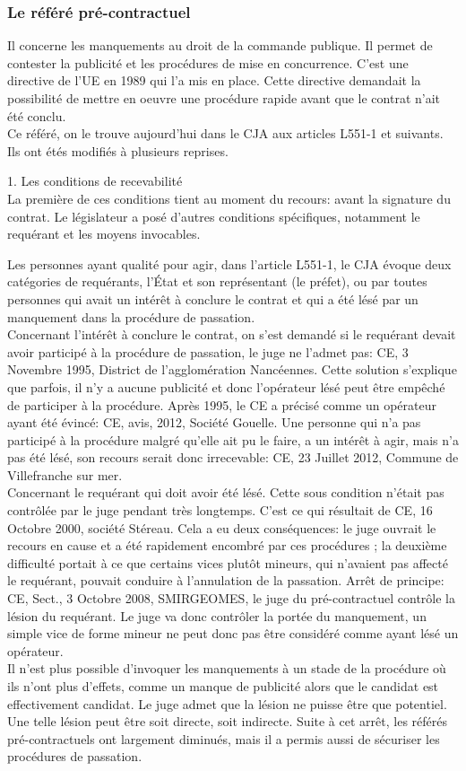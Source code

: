 \documentclass[10pt, a4paper, openany]{book}
\begin{document}
\subsubsection{Le référé pré-contractuel}

Il concerne les manquements au droit de la commande publique. Il permet de contester la publicité et les procédures de mise en concurrence. C'est une directive de l'UE en 1989 qui l'a mis en place. Cette directive demandait la possibilité de mettre en oeuvre une procédure rapide avant que le contrat n'ait été conclu. \\
Ce référé, on le trouve aujourd'hui dans le CJA aux articles L551-1 et suivants. Ils ont étés modifiés à plusieurs reprises.


1. Les conditions de recevabilité \\
La première de ces conditions tient au moment du recours: avant la signature du contrat. Le législateur a posé d'autres conditions spécifiques, notamment le requérant et les moyens invocables.


Les personnes ayant qualité pour agir, dans l'article L551-1, le CJA évoque deux catégories de requérants, l'État et son représentant (le préfet), ou par toutes personnes qui avait un intérêt à conclure le contrat et qui a été lésé par un manquement dans la procédure de passation. \\
Concernant l'intérêt à conclure le contrat, on s'est demandé si le requérant devait avoir participé à la procédure de passation, le juge ne l'admet pas: CE, 3 Novembre 1995, District de l'agglomération Nancéennes. Cette solution s'explique que parfois, il n'y a aucune publicité et donc l'opérateur lésé peut être empêché de participer à la procédure. Après 1995, le CE a précisé comme un opérateur ayant été évincé: CE, avis, 2012, Société Gouelle. Une personne qui n'a pas participé à la procédure malgré qu'elle ait pu le faire, a un intérêt à agir, mais n'a pas été lésé, son recours serait donc irrecevable: CE, 23 Juillet 2012, Commune de Villefranche sur mer. \\
Concernant le requérant qui doit avoir été lésé. Cette sous condition n'était pas contrôlée par le juge pendant très longtemps. C'est ce qui résultait de CE, 16 Octobre 2000, société Stéreau. Cela a eu deux conséquences: le juge ouvrait le recours en cause et a été rapidement encombré par ces procédures ; la deuxième difficulté portait à ce que certains vices plutôt mineurs, qui n'avaient pas affecté le requérant, pouvait conduire à l'annulation de la passation. Arrêt de principe: CE, Sect., 3 Octobre 2008, SMIRGEOMES, le juge du pré-contractuel contrôle la lésion du requérant. Le juge va donc contrôler la portée du manquement, un simple vice de forme mineur ne peut donc pas être considéré comme ayant lésé un opérateur. \\
Il n'est plus possible d'invoquer les manquements à un stade de la procédure où ils n'ont plus d'effets, comme un manque de publicité alors que le candidat est effectivement candidat. Le juge admet que la lésion ne puisse être que potentiel. Une telle lésion peut être soit directe, soit indirecte. Suite à cet arrêt, les référés pré-contractuels ont largement diminués, mais il a permis aussi de sécuriser les procédures de passation. 
\end{document}
